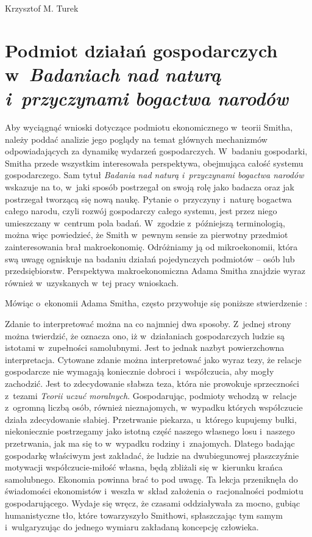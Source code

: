 \begin{artplenv}{Krzysztof M. Turek}
\section{Podmiot działań gospodarczych w~\textit{Badaniach nad naturą i~przyczynami bogactwa narodów}}

Aby wyciągnąć wnioski dotyczące podmiotu ekonomicznego w~teorii Smitha, należy poddać analizie jego poglądy na temat
głównych mechanizmów odpowiadających za dynamikę wydarzeń gospodarczych. W~badaniu gospodarki, Smitha przede wszystkim
interesowała perspektywa, obejmująca całość systemu gospodarczego. Sam tytuł \textit{Badania nad naturą i~przyczynami
bogactwa narodów }wskazuje na to, w~jaki sposób postrzegał on swoją rolę jako badacza oraz jak postrzegał tworzącą się
nową naukę. Pytanie o~przyczyny i~naturę bogactwa całego narodu, czyli rozwój gospodarczy całego systemu, jest przez
niego umieszczany w~centrum pola badań. W~zgodzie z~późniejszą terminologią, można więc powiedzieć, że Smith w~pewnym
sensie za pierwotny przedmiot zainteresowania brał makroekonomię. Odróżniamy ją od mikroekonomii, która swą uwagę
ogniskuje na badaniu działań pojedynczych podmiotów -- osób lub przedsiębiorstw. Perspektywa makroekonomiczna Adama
Smitha znajdzie wyraz również w~uzyskanych w~tej pracy wnioskach.

Mówiąc o~ekonomii Adama Smitha, często przywołuje się poniższe stwierdzenie
\parencite[s.~20]{smith_badania_2007}:

Zdanie to interpretować można na co najmniej dwa sposoby. Z~jednej strony można twierdzić, że oznacza ono,
iż w~działaniach gospodarczych ludzie są istotami w~zupełności samolubnymi. Jest to jednak nazbyt powierzchowna
interpretacja. Cytowane zdanie można interpretować jako wyraz tezy, że relacje gospodarcze nie wymagają koniecznie
dobroci i~współczucia, aby mogły zachodzić. Jest to zdecydowanie słabsza teza, która nie prowokuje
sprzeczności z~tezami \textit{Teorii uczuć moralnych}. Gospodarując, podmioty wchodzą w~relacje z~ogromną liczbą osób, również
nieznajomych, w~wypadku których współczucie działa zdecydowanie słabiej. Przetrwanie piekarza, u~którego kupujemy
bułki, niekoniecznie postrzegamy jako istotną część naszego własnego losu i~naszego przetrwania, jak ma się
to w~wypadku rodziny i~znajomych. Dlatego badając gospodarkę właściwym jest zakładać, że ludzie na dwubiegunowej
płaszczyźnie motywacji współczucie-miłość własna, będą zbliżali się w~kierunku krańca samolubnego. Ekonomia powinna
brać to pod uwagę. Ta lekcja przeniknęła do świadomości ekonomistów i~weszła w~skład założenia o~racjonalności podmiotu
gospodarującego. Wydaje się wręcz, że czasami oddziaływała za mocno, gubiąc humanistyczne tło, które towarzyszyło
Smithowi, spłaszczając tym samym i~wulgaryzując do jednego wymiaru zakładaną koncepcję człowieka.


\end{artplenv}
